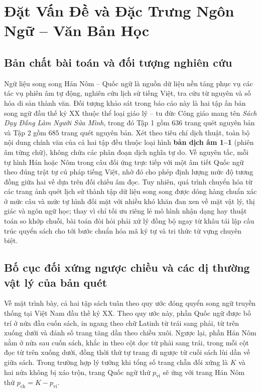 \section{Đặt Vấn Đề và Đặc Trưng Ngôn Ngữ -- Văn Bản Học}

\subsection{Bản chất bài toán và đối tượng nghiên cứu}

Ngữ liệu song song Hán Nôm -- Quốc ngữ là nguồn dữ liệu nền tảng phục vụ các tác vụ phiên âm tự động, nghiên cứu lịch sử tiếng Việt, tra cứu từ nguyên và số hóa di sản thành văn. Đối tượng khảo sát trong báo cáo này là hai tập ấn bản song ngữ đầu thế kỷ XX thuộc thể loại giáo lý -- tu đức Công giáo mang tên \textit{Sách Dạy Đấng Làm Người Sửa Mình}, trong đó Tập 1 gồm $636$ trang quét nguyên bản và Tập 2 gồm $685$ trang quét nguyên bản. Xét theo tiêu chí dịch thuật, toàn bộ nội dung chính văn của cả hai tập đều thuộc loại hình \textbf{bản dịch âm 1--1} (phiên âm từng chữ), không chứa các phân đoạn dịch nghĩa tự do. Về nguyên tắc, mỗi tự hình Hán hoặc Nôm trong câu đối ứng trực tiếp với một âm tiết Quốc ngữ theo đúng trật tự cú pháp tiếng Việt, nhờ đó cho phép định lượng mức độ tương đồng giữa hai vế dựa trên đối chiếu âm đọc. Tuy nhiên, quá trình chuyển hóa từ các trang ảnh quét lịch sử thành tập dữ liệu song song được dóng hàng chuẩn xác ở mức câu và mức tự hình đối mặt với nhiều khó khăn đan xen về mặt vật lý, thị giác và ngôn ngữ học; thay vì chỉ tối ưu riêng lẻ mô hình nhận dạng hay thuật toán so khớp chuỗi, bài toán đòi hỏi phải xử lý đồng bộ ngay từ khâu tái lập cấu trúc quyển sách cho tới bước chuẩn hóa mã ký tự và tri thức từ vựng chuyên biệt.

\subsection{Bố cục đối xứng ngược chiều và các dị thường vật lý của bản quét}

Về mặt trình bày, cả hai tập sách tuân theo quy ước đóng quyển song ngữ truyền thống tại Việt Nam đầu thế kỷ XX. Theo quy ước này, phần Quốc ngữ được bố trí ở nửa đầu cuốn sách, in ngang theo chữ Latinh từ trái sang phải, từ trên xuống dưới và đánh số trang tăng dần theo chiều xuôi. Ngược lại, phần Hán Nôm nằm ở nửa sau cuốn sách, khắc in theo cột dọc từ phải sang trái, trong mỗi cột đọc từ trên xuống dưới, đồng thời thứ tự trang đi ngược từ cuối sách lùi dần về giữa sách. Trong trường hợp lý tưởng khi tổng số trang chẵn đối xứng là $K$ và hai nửa không bị xáo trộn, trang Quốc ngữ thứ $p_{\text{vi}}$ sẽ ứng với trang Hán Nôm thứ $p_{\text{ch}} = K - p_{\text{vi}}$.

